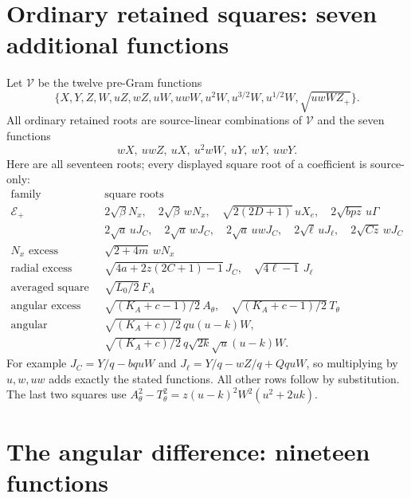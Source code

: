 \documentclass[11pt]{article}
\begin{document}
\section{Ordinary retained squares: seven additional functions}

Let $\mathcal V$ be the twelve pre-Gram functions
\[
 \{X,Y,Z,W,uZ,wZ,uW,uwW,u^2W,
                     u^{3/2}W,u^{1/2}W,\sqrt{uwWZ_+}\}.
\]
All ordinary retained roots are source-linear combinations of
$\mathcal V$ and the seven functions
\[
                   wX,\ uwZ,\ uX,\ u^2wW,\ uY,\ wY,\ uwY.
\]
Here are all seventeen roots; every displayed square root of a
coefficient is source-only:
\[
\begin{array}{c|l}
\text{family}&\text{square roots}\\\hline
\mathcal E_+&2\sqrt\beta N_x,\quad2\sqrt\beta\,wN_x,\quad
 \sqrt{2(2D+1)}\,uX_e,\quad2\sqrt{bpz}\,u\Gamma\\
 &2\sqrt a\,uJ_C,\quad2\sqrt a\,wJ_C,\quad2\sqrt a\,uwJ_C,\quad
 2\sqrt\ell\,uJ_\ell,\quad2\sqrt{Cz}\,wJ_C\\
N_x\text{ excess}&\sqrt{2+4m}\,wN_x\\
\text{radial excess}&\sqrt{4a+2z(2C+1)-1}\,J_C,\quad
                              \sqrt{4\ell-1}\,J_\ell\\
\text{averaged square}&\sqrt{L_0/2}\,F_A\\
\text{angular excess}&\sqrt{(K_A+c-1)/2}\,A_\theta,\quad
                       \sqrt{(K_A+c-1)/2}\,T_\theta\\
\text{angular difference}&\sqrt{(K_A+c)/2}\,qu(u-k)W,\\
 &\sqrt{(K_A+c)/2}\,q\sqrt{2k}\sqrt u(u-k)W.
\end{array}
\]
For example $J_C=Y/q-bquW$ and
$J_\ell=Y/q-wZ/q+QquW$, so multiplying by $u,w,uw$ adds
exactly the stated functions. All other rows follow by substitution.
The last two squares use
$A_\theta^2-T_\theta^2=z(u-k)^2W^2(u^2+2uk)$.

\section{The angular difference: nineteen functions}
\end{document}
